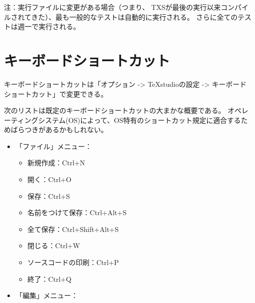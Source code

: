 注：実行ファイルに変更がある場合（つまり、
TXSが最後の実行以来コンパイルされてきた）、最も一般的なテストは自動的に実行される。
さらに全てのテストは週一で実行される。

\section{キーボードショートカット}

キーボードショートカットは「オプション -\textgreater{} TeXstudioの設定 -\textgreater{} キーボードショートカット」で変更できる。

次のリストは既定のキーボードショートカットの大まかな概要である。
オペレーティングシステム(OS)によって、OS特有のショートカット規定に適合するためばらつきがあるかもしれない。

\begin{itemize}
\item
  「ファイル」メニュー：

  \begin{itemize}
  \item
    新規作成：Ctrl+N
  \item
    開く：Ctrl+O
  \item
    保存：Ctrl+S
  \item
    名前をつけて保存：Ctrl+Alt+S
  \item
    全て保存：Ctrl+Shift+Alt+S
  \item
    閉じる：Ctrl+W
  \item
    ソースコードの印刷：Ctrl+P
  \item
    終了：Ctrl+Q
  \end{itemize}
\item
  「編集」メニュー：


\end{itemize}
